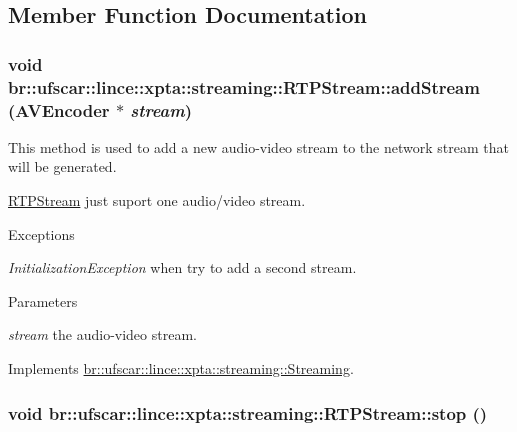 \subsection{Member Function Documentation}
\hypertarget{classbr_1_1ufscar_1_1lince_1_1xpta_1_1streaming_1_1RTPStream_ae4bab4f526f60b671a2baa9bfeae0189}{
\subsubsection[{addStream}]{\setlength{\rightskip}{0pt plus 5cm}void br::ufscar::lince::xpta::streaming::RTPStream::addStream ({\bf AVEncoder} $\ast$ {\em stream})}}
\label{classbr_1_1ufscar_1_1lince_1_1xpta_1_1streaming_1_1RTPStream_ae4bab4f526f60b671a2baa9bfeae0189}


This method is used to add a new audio-\/video stream to the network stream that will be generated. 

\hyperlink{classbr_1_1ufscar_1_1lince_1_1xpta_1_1streaming_1_1RTPStream}{RTPStream} just suport one audio/video stream. 
\begin{DoxyExceptions}{Exceptions}
\item[{\em InitializationException}]when try to add a second stream. \end{DoxyExceptions}

\begin{DoxyParams}{Parameters}
\item[{\em stream}]the audio-\/video stream. \end{DoxyParams}


Implements \hyperlink{classbr_1_1ufscar_1_1lince_1_1xpta_1_1streaming_1_1Streaming_aec5910b2e3d8c442c16b08ee4717cad5}{br::ufscar::lince::xpta::streaming::Streaming}.

\hypertarget{classbr_1_1ufscar_1_1lince_1_1xpta_1_1streaming_1_1RTPStream_ac5f8339bae0f9a0dbf5068fc78cd2df4}{
\subsubsection[{stop}]{\setlength{\rightskip}{0pt plus 5cm}void br::ufscar::lince::xpta::streaming::RTPStream::stop ()}}
\label{classbr_1_1ufscar_1_1lince_1_1xpta_1_1streaming_1_1RTPStream_ac5f8339bae0f9a0dbf5068fc78cd2df4}


